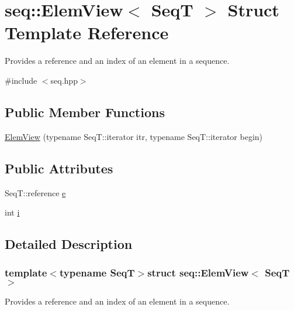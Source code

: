 \hypertarget{structseq_1_1_elem_view}{\section{seq\-:\-:Elem\-View$<$ Seq\-T $>$ Struct Template Reference}
\label{structseq_1_1_elem_view}
}


Provides a reference and an index of an element in a sequence.  




{\ttfamily \#include $<$seq.\-hpp$>$}

\subsection*{Public Member Functions}
\begin{DoxyCompactItemize}
\item 
\hyperlink{structseq_1_1_elem_view_ad435d6c641e7b7e6123d472d4e41fa68}{Elem\-View} (typename Seq\-T\-::iterator itr, typename Seq\-T\-::iterator begin)
\end{DoxyCompactItemize}
\subsection*{Public Attributes}
\begin{DoxyCompactItemize}
\item 
Seq\-T\-::reference \hyperlink{structseq_1_1_elem_view_aebd98f7c33ce0c247fe5257178eedb12}{e}
\item 
int \hyperlink{structseq_1_1_elem_view_aa6ca1502930c99050f332769f5af1322}{i}
\end{DoxyCompactItemize}


\subsection{Detailed Description}
\subsubsection*{template$<$typename Seq\-T$>$struct seq\-::\-Elem\-View$<$ Seq\-T $>$}

Provides a reference and an index of an element in a sequence. 

